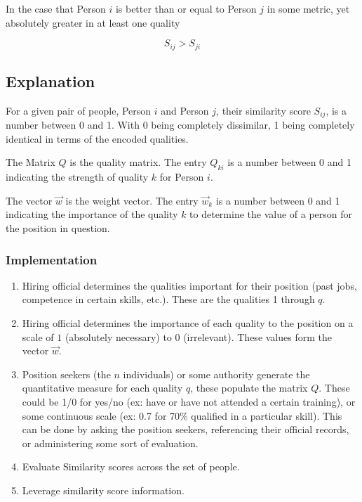 In the case that Person $i$ is better than or equal to Person $j$ in some metric, yet absolutely greater in at least one quality

\[S_{ij} > S_{ji}\]

\subsection{Explanation}

For a given pair of people, Person $i$ and Person $j$, their similarity score $S_{ij}$, is a number between 0 and 1. With 0 being completely dissimilar, 1 being completely identical in terms of the encoded qualities. 

The Matrix $Q$ is the quality matrix. The entry $Q_{ki}$ is a number between 0 and 1 indicating the strength of quality $k$ for Person $i$.

The vector $\vec{w}$ is the weight vector. The entry $\vec{w}_k$ is a number between 0 and 1 indicating the importance of the quality $k$ to determine the value of a person for the position in question.


\subsubsection{Implementation}

\begin{enumerate}
\item Hiring official determines the qualities important for their position (past jobs, competence in certain skills, etc.). These are the qualities 1 through $q$.
\item Hiring official determines the importance of each quality to the position on a scale of $1$ (absolutely necessary) to $0$ (irrelevant). These values form the vector $\vec{w}$.
\item Position seekers (the $n$ individuals) or some authority generate the quantitative measure for each quality $q$, these populate the matrix $Q$. These could be 1/0 for yes/no (ex: have or have not attended a certain training), or some continuous scale (ex: 0.7 for 70\% qualified in a particular skill). This can be done by asking the position seekers, referencing their official records, or administering some sort of evaluation.
\item Evaluate Similarity scores across the set of people.
\item Leverage similarity score information.
\end{enumerate}

